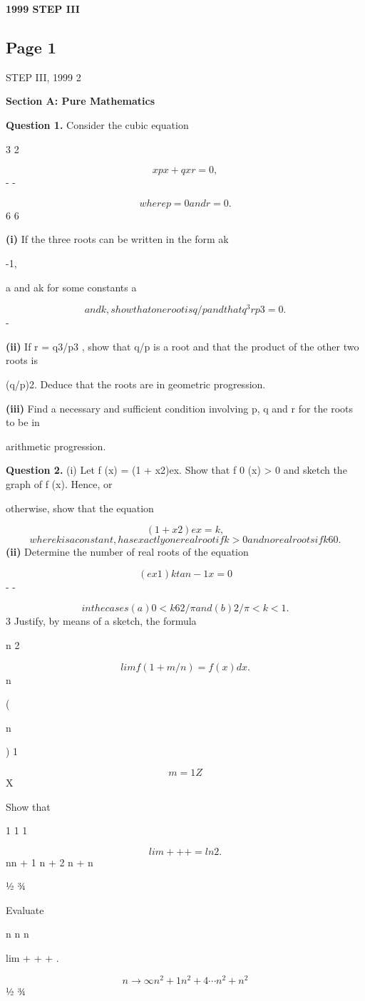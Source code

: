 \documentclass[12pt]{article}
\begin{document}
\begin{center}
{\Large \textbf{1999 STEP III}}
\end{center}

\subsection*{Page 1}
\begin{flushleft}
STEP III, 1999 2\par
\bigskip\textbf{Section A: Pure Mathematics}\par
\bigskip\textbf{Question 1.} Consider the cubic equation\par
3 2\par
\[x px + qx r = 0 ,\]
- -\par
\[where p = 0 and r = 0.\]
6 6\par
\textbf{(i)} If the three roots can be written in the form ak\par
-1,\par
a and ak for some constants a\par
\[and k, show that one root is q/p and that q^3 rp3 = 0 .\]
-\par
\textbf{(ii)} If r = q3/p3 , show that q/p is a root and that the product of the other two roots is\par
(q/p)2. Deduce that the roots are in geometric progression.\par
\textbf{(iii)} Find a necessary and sufficient condition involving p, q and r for the roots to be in\par
arithmetic progression.\par
\bigskip\textbf{Question 2.} (i) Let f (x) = (1 + x2)ex. Show that f 0 (x) > 0 and sketch the graph of f (x). Hence, or\par
otherwise, show that the equation\par
\[(1 + x 2 )ex = k,\]
\[where k is a constant, has exactly one real root if k > 0 and no real roots if k 6 0.\]
\textbf{(ii)} Determine the number of real roots of the equation\par
\[(ex 1) k tan -1 x = 0\]
- -\par
\[in the cases (a) 0 < k 6 2/\pi and (b) 2/\pi < k < 1.\]
3 Justify, by means of a sketch, the formula\par
n 2\par
\[lim f (1 + m/n) = f (x) dx .\]
n\to\infty\par
(\par
n\par
) 1\par
\[m=1 Z\]
X\par
Show that\par
1 1 1\par
\[lim + + + = ln 2 .\]
n\to\infty n + 1 n + 2 \cdots n + n\par
½ ¾\par
Evaluate\par
n n n\par
lim + + + .\par
\[n\to\infty n^2 + 1 n^2 + 4 \cdots n^2 + n^2\]
½ ¾\par
\end{flushleft}
\end{document}
